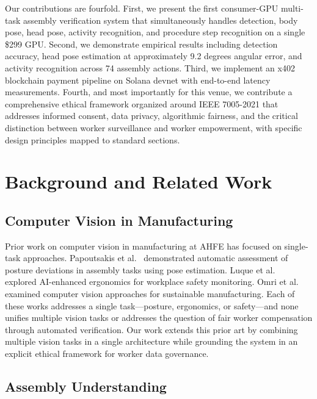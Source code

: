 \documentclass[10pt,twocolumn]{article}
\begin{document}
Our contributions are fourfold. First, we present the first consumer-GPU multi-task assembly verification system that simultaneously handles detection, body pose, head pose, activity recognition, and procedure step recognition on a single \$299 GPU. Second, we demonstrate empirical results including detection accuracy, head pose estimation at approximately 9.2 degrees angular error, and activity recognition across 74 assembly actions. Third, we implement an x402 blockchain payment pipeline on Solana devnet with end-to-end latency measurements. Fourth, and most importantly for this venue, we contribute a comprehensive ethical framework organized around IEEE 7005-2021 that addresses informed consent, data privacy, algorithmic fairness, and the critical distinction between worker surveillance and worker empowerment, with specific design principles mapped to standard sections.

\section{Background and Related Work}
\label{sec:related}

\subsection{Computer Vision in Manufacturing}

Prior work on computer vision in manufacturing at AHFE has focused on single-task approaches. Papoutsakis et al.~\cite{papoutsakis2024posture} demonstrated automatic assessment of posture deviations in assembly tasks using pose estimation. Luque et al.~\cite{luque2024ai} explored AI-enhanced ergonomics for workplace safety monitoring. Omri et al.~\cite{omri2024cv} examined computer vision approaches for sustainable manufacturing. Each of these works addresses a single task---posture, ergonomics, or safety---and none unifies multiple vision tasks or addresses the question of fair worker compensation through automated verification. Our work extends this prior art by combining multiple vision tasks in a single architecture while grounding the system in an explicit ethical framework for worker data governance.

\subsection{Assembly Understanding}
\end{document}
